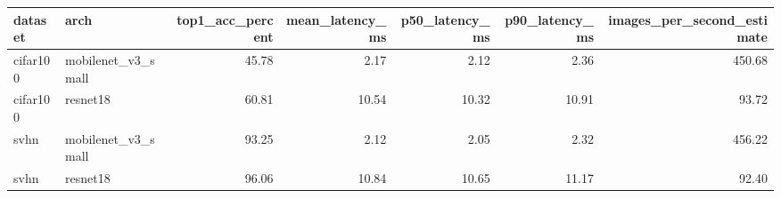 \begin{tabular}{llrrrrr}
\toprule
dataset & arch & top1_acc_percent & mean_latency_ms & p50_latency_ms & p90_latency_ms & images_per_second_estimate \\
\midrule
cifar100 & mobilenet_v3_small & 45.78 & 2.17 & 2.12 & 2.36 & 450.68 \\
cifar100 & resnet18 & 60.81 & 10.54 & 10.32 & 10.91 & 93.72 \\
svhn & mobilenet_v3_small & 93.25 & 2.12 & 2.05 & 2.32 & 456.22 \\
svhn & resnet18 & 96.06 & 10.84 & 10.65 & 11.17 & 92.40 \\
\bottomrule
\end{tabular}
